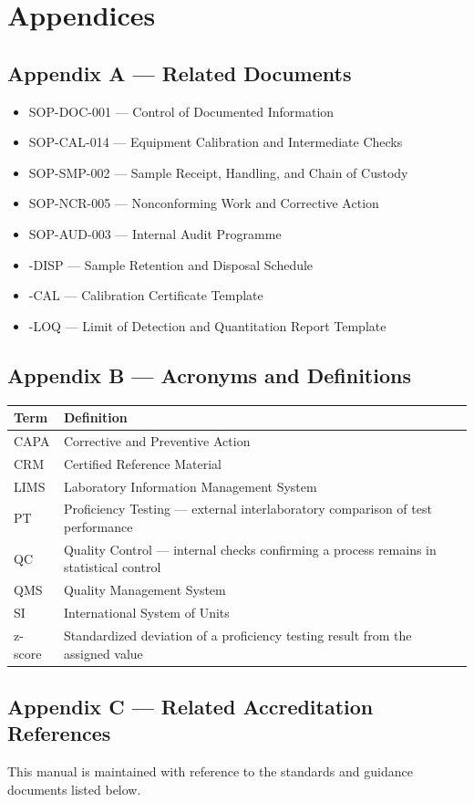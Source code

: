 
\section{Appendices}

\subsection{Appendix A --- Related Documents}

\begin{itemize}
  \item SOP-DOC-001 --- Control of Documented Information
  \item SOP-CAL-014 --- Equipment Calibration and Intermediate Checks
  \item SOP-SMP-002 --- Sample Receipt, Handling, and Chain of Custody
  \item SOP-NCR-005 --- Nonconforming Work and Corrective Action
  \item SOP-AUD-003 --- Internal Audit Programme
  \item \doccode-DISP --- Sample Retention and Disposal Schedule
  \item \doccode-CAL --- Calibration Certificate Template
  \item \doccode-LOQ --- Limit of Detection and Quantitation Report Template
\end{itemize}

\subsection{Appendix B --- Acronyms and Definitions}

\begin{table}[h]
\centering
\small
\renewcommand{\arraystretch}{1.3}
\begin{tabularx}{\linewidth}{@{}l X@{}}
\toprule
\textbf{Term} & \textbf{Definition} \\
\midrule
CAPA & Corrective and Preventive Action \\
CRM & Certified Reference Material \\
LIMS & Laboratory Information Management System \\
PT & Proficiency Testing --- external interlaboratory comparison of test performance \\
QC & Quality Control --- internal checks confirming a process remains in statistical control \\
QMS & Quality Management System \\
SI & International System of Units \\
z-score & Standardized deviation of a proficiency testing result from the assigned value \\
\bottomrule
\end{tabularx}
\end{table}

\subsection{Appendix C --- Related Accreditation References}

This manual is maintained with reference to the standards and guidance documents listed
below.



